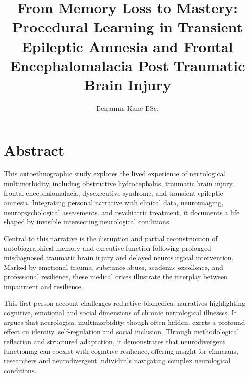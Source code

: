 \documentclass{article}
\title{From Memory Loss to Mastery: Procedural Learning in Transient Epileptic Amnesia and Frontal Encephalomalacia Post Traumatic Brain Injury}
\author{Benjamin Kane BSc.}
\begin{document}
\maketitle

\section*{Abstract}
This autoethnographic study explores the lived experience of neurological multimorbidity, including obstructive hydrocephalus, traumatic brain injury, frontal encephalomalacia, dysexecutive syndrome, and transient epileptic amnesia. Integrating personal narrative with clinical data, neuroimaging, neuropsychological assessments, and psychiatric treatment, it documents a life shaped by invisible intersecting neurological conditions.

Central to this narrative is the disruption and partial reconstruction of autobiographical memory and executive function following prolonged misdiagnosed traumatic brain injury and delayed neurosurgical intervention. Marked by emotional trauma, substance abuse, academic excellence, and professional resilience, these medical crises illustrate the interplay between impairment and resilience.

This first-person account challenges reductive biomedical narratives highlighting cognitive, emotional and social dimensions of chronic neurological illnesses. It argues that neurological multimorbidity, though often hidden, exerts a profound effect on identity, self-regulation and social inclusion. Through methodological reflection and structured adaptation, it demonstrates that neurodivergent functioning can coexist with cognitive resilience, offering insight for clinicians, researchers and neurodivergent individuals navigating complex neurological conditions.
\end{document}
